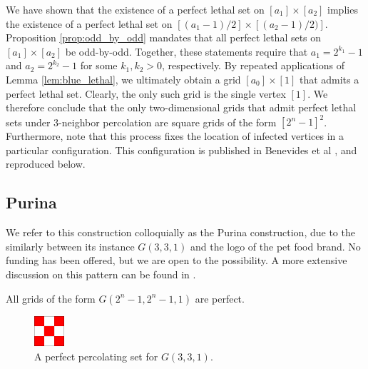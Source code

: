 We have shown that the existence of a perfect lethal set on $[a_1] \times [a_2]$ implies the existence of a perfect lethal set on $[(a_1-1)/2] \times [(a_2-1)/2)]$. Proposition \ref{prop:odd_by_odd} mandates that all perfect lethal sets on $[a_1] \times [a_2]$ be odd-by-odd. Together, these statements require that $a_1 = 2^{k_1}-1$ and $a_2 = 2^{k_2}-1$ for some $k_1,k_2 > 0$, respectively. By repeated applications of Lemma \ref{lem:blue_lethal}, we ultimately obtain a grid $[a_0] \times [1]$ that admits a perfect lethal set. Clearly, the only such grid is the single vertex $[1]$. We therefore conclude that the only two-dimensional grids that admit perfect lethal sets under 3-neighbor percolation are square grids of the form $[2^n-1]^2$. Furthermore, note that this process fixes the location of infected vertices in a particular configuration. This configuration is published in Benevides et al \cite{benevides:2021}, and reproduced below.

\subsection{Purina}

We refer to this construction colloquially as the Purina construction, due to the similarly between its instance $G(3,3,1)$ and the logo of the pet food brand. No funding has been offered, but we are open to the possibility. A more extensive discussion on this pattern can be found in \cite{benevides:2021}.

\begin{con}
\label{con:purina}
All grids of the form $G(2^n-1, 2^n-1, 1)$ are perfect.
\end{con}

\begin{figure}[]
\centering
\includegraphics[width=0.1\textwidth]{figures/7/3x3x1.pdf}
\caption{A perfect percolating set for $G(3,3,1)$.}
\label{fig:3x3x1}
\end{figure} 

